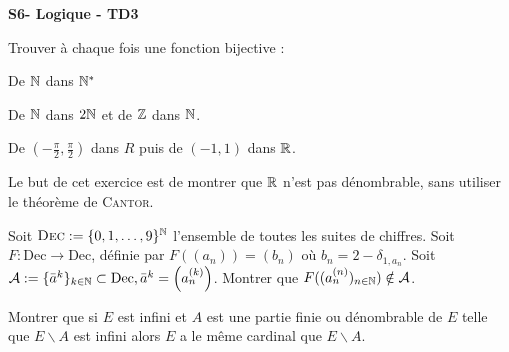 \documentclass[french]{report}
\begin{document}
\begin{center}
    \huge{\textbf{S6- Logique - TD3}}
\end{center}

\begin{exo}
    Trouver à chaque fois une fonction bijective :
    \begin{q}{1}
        De \(\mathbb{N}\) dans \(\mathbb{N}^*\)
    \end{q}
    \begin{q}{2}
        De \(\mathbb{N}\) dans \(2\mathbb{N}\) et de \(\mathbb{Z}\) dans \(\mathbb{N}\).
    \end{q}
    \begin{q}{3}
        De \((-\frac\pi2,\frac\pi2)\) dans \(R\) puis de \((-1,1)\) dans \(\mathbb{R}\).
    \end{q}
\end{exo}

\begin{exo}
    Le but de cet exercice est de montrer que \(\mathbb{R}\) n'est pas dénombrable, sans utiliser
    le théorème de \textsc{Cantor}.
    \begin{q}{1}
        Soit \(\textsc{Dec}:=\{0,1,\dots,9\}^{\mathbb{N}}\) l'ensemble de toutes les suites
        de chiffres. Soit \(F:\textrm{Dec}\to\text{Dec}\), définie par \(F((a_n))=(b_n)\)
        où \(b_n = 2 - \delta_{1,a_n}\).
        Soit \(\mathcal{A}:=\{\bar{a}^k\}_{k\in\mathbb{N}}\subset\text{Dec},\bar{a}^k=
        \left(a^{(k)}_n\right)\). Montrer que \(F((a^{(n)}_n)_{n\in\mathbb{N}})\notin\mathcal{A}\).
    \end{q}
\end{exo}

\begin{exo}
    Montrer que si \(E\) est infini et \(A\) est une partie finie ou dénombrable de \(E\)
    telle que \(E\backslash A\) est infini alors \(E\) a le même cardinal
    que \(E\backslash A\).
\end{exo}
\end{document}
